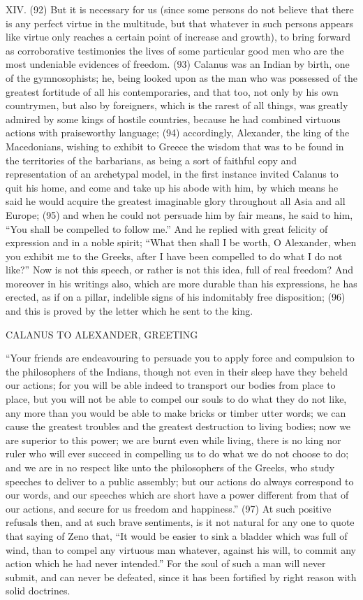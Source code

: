 XIV. (92) But it is necessary for us (since some persons do not believe that there is any perfect
virtue in the multitude, but that whatever in such persons appears like virtue only reaches a certain
point of increase and growth), to bring forward as corroborative testimonies the lives of some
particular good men who are the most undeniable evidences of freedom. (93) Calanus was an
Indian by birth, one of the gymnosophists; he, being looked upon as the man who was possessed
of the greatest fortitude of all his contemporaries, and that too, not only by his own countrymen, but
also by foreigners, which is the rarest of all things, was greatly admired by some kings of hostile
countries, because he had combined virtuous actions with praiseworthy language; (94)
accordingly, Alexander, the king of the Macedonians, wishing to exhibit to Greece the wisdom that
was to be found in the territories of the barbarians, as being a sort of faithful copy and
representation of an archetypal model, in the first instance invited Calanus to quit his home, and
come and take up his abode with him, by which means he said he would acquire the greatest
imaginable glory throughout all Asia and all Europe; (95) and when he could not persuade him by
fair means, he said to him, ``You shall be compelled to follow me.'' And he replied with great felicity
of expression and in a noble spirit; ``What then shall I be worth, O Alexander, when you exhibit me
to the Greeks, after I have been compelled to do what I do not like?'' Now is not this speech, or
rather is not this idea, full of real freedom? And moreover in his writings also, which are more
durable than his expressions, he has erected, as if on a pillar, indelible signs of his indomitably free
disposition; (96) and this is proved by the letter which he sent to the king.

CALANUS TO ALEXANDER, GREETING

``Your friends are endeavouring to persuade you to apply force and compulsion to the philosophers
of the Indians, though not even in their sleep have they beheld our actions; for you will be able
indeed to transport our bodies from place to place, but you will not be able to compel our souls to
do what they do not like, any more than you would be able to make bricks or timber utter words; we
can cause the greatest troubles and the greatest destruction to living bodies; now we are superior
to this power; we are burnt even while living, there is no king nor ruler who will ever succeed in
compelling us to do what we do not choose to do; and we are in no respect like unto the
philosophers of the Greeks, who study speeches to deliver to a public assembly; but our actions do
always correspond to our words, and our speeches which are short have a power different from
that of our actions, and secure for us freedom and happiness.'' (97) At such positive refusals then,
and at such brave sentiments, is it not natural for any one to quote that saying of Zeno that, ``It
would be easier to sink a bladder which was full of wind, than to compel any virtuous man whatever,
against his will, to commit any action which he had never intended.'' For the soul of such a man will
never submit, and can never be defeated, since it has been fortified by right reason with solid
doctrines.

